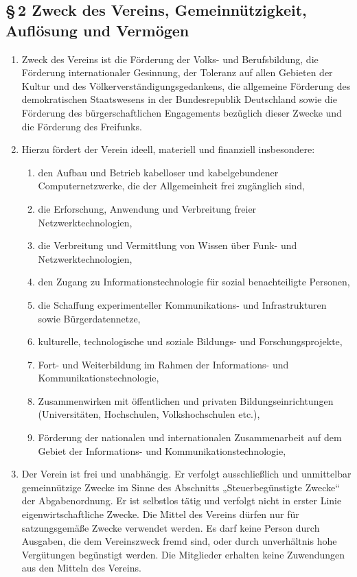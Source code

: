 \documentclass[12pt,a4paper]{article}
\begin{document}
\subsection*{§\,2 Zweck des Vereins, Gemeinnützigkeit, Auflösung und Vermögen}
\begin{enumerate}
\item Zweck des Vereins ist die Förderung der Volks- und Berufsbildung, die Förderung internationaler Gesinnung, der Toleranz auf allen Gebieten der Kultur und des Völkerverständigungsgedankens, die allgemeine Förderung des demokratischen Staatswesens in der Bundesrepublik Deutschland sowie die Förderung des bürgerschaftlichen Engagements bezüglich dieser Zwecke und die Förderung des Freifunks.
\item Hierzu fördert der Verein ideell, materiell und finanziell insbesondere:
\begin{enumerate}
\item den Aufbau und Betrieb kabelloser und kabelgebundener Computernetzwerke, die der Allgemeinheit frei zugänglich sind,
\item die Erforschung, Anwendung und Verbreitung freier Netzwerktechnologien,
\item die Verbreitung und Vermittlung von Wissen über Funk- und Netzwerktechnologien,
\item den Zugang zu Informationstechnologie für sozial benachteiligte Personen,
\item die Schaffung experimenteller Kommunikations- und Infrastrukturen sowie Bürgerdatennetze,
\item kulturelle, technologische und soziale Bildungs- und Forschungsprojekte,
\item Fort- und Weiterbildung im Rahmen der Informations- und Kommunikationstechnologie,
\item Zusammenwirken mit öffentlichen und privaten Bildungseinrichtungen (Universitäten, Hochschulen, Volkshochschulen etc.),
\item Förderung der nationalen und internationalen Zusammenarbeit auf dem Gebiet der Informations- und Kommunikationstechnologie,
\end{enumerate}
\item Der Verein ist frei und unabhängig. Er verfolgt ausschließlich und unmittelbar gemeinnützige Zwecke im Sinne des Abschnitts „Steuerbegünstigte Zwecke“ der Abgabenordnung. Er ist selbstlos tätig und verfolgt nicht in erster Linie eigenwirtschaftliche Zwecke. Die Mittel des Vereins dürfen nur für satzungsgemäße Zwecke verwendet werden. Es darf keine Person durch Ausgaben, die dem Vereinszweck fremd sind, oder durch unverhältnis hohe Vergütungen begünstigt werden. Die Mitglieder erhalten keine Zuwendungen aus den Mitteln des Vereins.

\end{enumerate}
\end{document}
